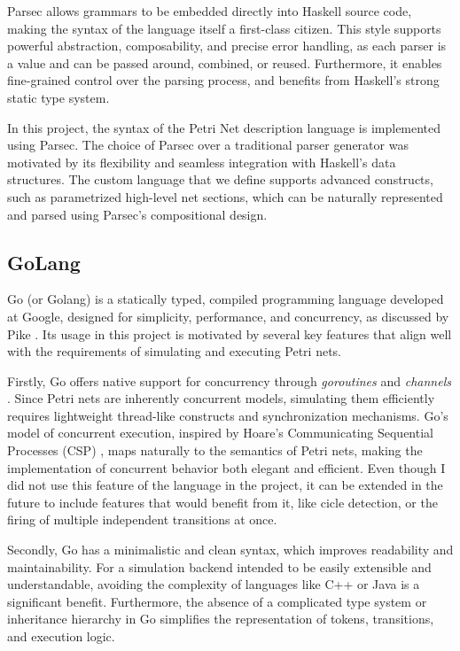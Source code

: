 \documentclass[12pt]{article}
\begin{document}
        Parsec allows grammars to be embedded directly into Haskell source code, making the syntax of the language itself a first-class citizen. This style supports powerful abstraction, composability, and precise error handling, as each parser is a value and can be passed around, combined, or reused. Furthermore, it enables fine-grained control over the parsing process, and benefits from Haskell's strong static type system.
        
        In this project, the syntax of the Petri Net description language is implemented using Parsec. The choice of Parsec over a traditional parser generator was motivated by its flexibility and seamless integration with Haskell's data structures. The custom language that we define supports advanced constructs, such as parametrized high-level net sections, which can be naturally represented and parsed using Parsec's compositional design.
        
    \subsection{GoLang}
    Go (or Golang) \cite{golang} is a statically typed, compiled programming language developed at Google, designed for simplicity, performance, and concurrency, as discussed by Pike \cite{pike2012go}. Its usage in this project is motivated by several key features that align well with the requirements of simulating and executing Petri nets.

    Firstly, Go offers native support for concurrency through \emph{goroutines} and \emph{channels} \cite{pike2012go}. Since Petri nets are inherently concurrent models, simulating them efficiently requires lightweight thread-like constructs and synchronization mechanisms. Go's model of concurrent execution, inspired by Hoare's Communicating Sequential Processes (CSP) \cite{brookes1984theory}, maps naturally to the semantics of Petri nets, making the implementation of concurrent behavior both elegant and efficient.
    Even though I did not use this feature of the language in the project, it can be extended in the future to include features that would benefit from it, like cicle detection, or the firing of multiple independent transitions at once.

    Secondly, Go has a minimalistic and clean syntax, which improves readability and maintainability. For a simulation backend intended to be easily extensible and understandable, avoiding the complexity of languages like C++ or Java is a significant benefit. Furthermore, the absence of a complicated type system or inheritance hierarchy in Go simplifies the representation of tokens, transitions, and execution logic.
\end{document}
